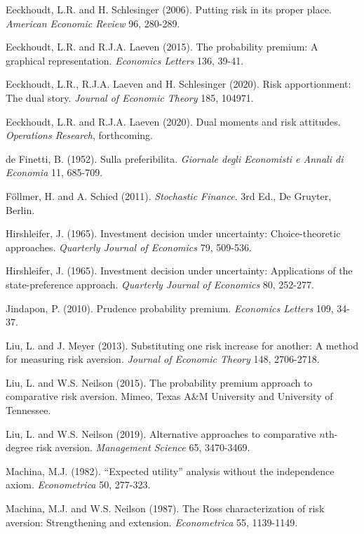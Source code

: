 \documentclass[11pt]{article}
\begin{document}
\begin{spacing}{0.0}
\begin{thebibliography}{99}
{\sc Eeckhoudt, L.R. and H. Schlesinger} (2006).
Putting risk in its proper place.
{\it American Economic Review} 96, 280-289. 

{\sc Eeckhoudt, L.R. and R.J.A. Laeven} (2015).
The probability premium: A graphical representation.
{\it Economics Letters} 136, 39-41.

{\sc Eeckhoudt, L.R., R.J.A. Laeven and H. Schlesinger} (2020).
Risk apportionment: The dual story.
{\it Journal of Economic Theory} 185, 104971.

{\sc Eeckhoudt, L.R. and R.J.A. Laeven} (2020).
Dual moments and risk attitudes.
{\it Operations Research}, forthcoming.

{\sc de Finetti, B.} (1952).
Sulla preferibilita.
{\it Giornale degli Economisti e Annali di Economia} 11, 685-709.

{\sc F\"{o}llmer, H. and A. Schied} (2011).
{\it Stochastic Finance}.
3rd Ed., De Gruyter, Berlin.

{\sc Hirshleifer, J.} (1965).
Investment decision under uncertainty: Choice-theoretic approaches.
{\it Quarterly Journal of Economics} 79, 509-536.

{\sc Hirshleifer, J.} (1965).
Investment decision under uncertainty: Applications of the state-preference approach.
{\it Quarterly Journal of Economics} 80, 252-277.

{\sc Jindapon, P.} (2010).
Prudence probability premium.
{\it Economics Letters} 109, 34-37.

{\sc Liu, L. and J. Meyer} (2013).
Substituting one risk increase for another: A method for measuring risk aversion.
{\it Journal of Economic Theory} 148, 2706-2718.

{\sc Liu, L. and W.S. Neilson} (2015).
The probability premium approach to comparative risk aversion.
Mimeo, Texas A\&M University and University of Tennessee.

{\sc Liu, L. and W.S. Neilson} (2019).
Alternative approaches to comparative $n$th-degree risk aversion.
{\it Management Science} 65, 3470-3469.

{\sc Machina, M.J.} (1982).
``Expected utility'' analysis without the independence axiom.
{\it Econometrica} 50, 277-323.

{\sc Machina, M.J. and W.S. Neilson} (1987).
The Ross characterization of risk aversion: Strengthening and extension.
{\it Econometrica} 55, 1139-1149.


\end{thebibliography}
\end{spacing}
\end{document}
